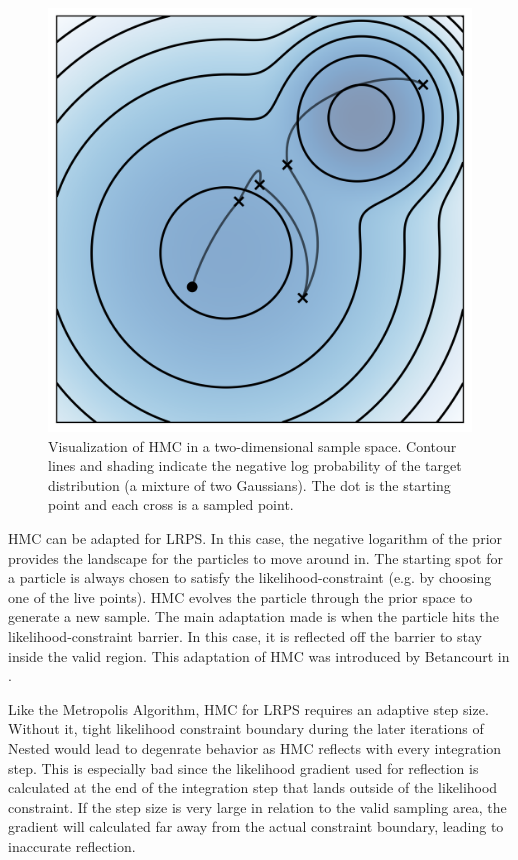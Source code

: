 \documentclass[12pt, a4paper]{report}
\begin{document}
\begin{figure}
    \centering
    \includegraphics[scale=0.8]{hmc_example.png}
    \caption{Visualization of HMC in a two-dimensional sample space. Contour lines and shading indicate the negative log probability of the target distribution (a mixture of two Gaussians). The dot is the starting point and each cross is a sampled point.}
    \label{fig:hmc_example}
\end{figure}

HMC can be adapted for LRPS.
In this case, the negative logarithm of the prior provides the landscape for the particles to move around in.
The starting spot for a particle is always chosen to satisfy the likelihood-constraint (e.g. by choosing one of the live points).
HMC evolves the particle through the prior space to generate a new sample.
The main adaptation made is when the particle hits the likelihood-constraint barrier.
In this case, it is reflected off the barrier to stay inside the valid region.
This adaptation of HMC was introduced by Betancourt in \cite{hmc_in_ns}.

Like the Metropolis Algorithm, HMC for LRPS requires an adaptive step size.
Without it, tight likelihood constraint boundary during the later iterations of Nested would lead to degenrate behavior as HMC reflects with every integration step.
This is especially bad since the likelihood gradient used for reflection is calculated at the end of the integration step that lands outside of the likelihood constraint.
If the step size is very large in relation to the valid sampling area, the gradient will calculated far away from the actual constraint boundary, leading to inaccurate reflection.
\end{document}
